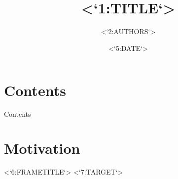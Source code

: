 \documentclass[17pt,dvipdfmx]{beamer}
\title{<`1:TITLE`>}
\author{<`2:AUTHORS`>}
\institute[<`3:INST`>]{<`4:FULLINST`>}
\date{<`5:DATE`>}
\begin{document}
\frame{\titlepage}

\section*{Contents}
\begin{frame}{Contents}
    \tableofcontents
\end{frame}

\section{Motivation}
\begin{frame}{<`6:FRAMETITLE`>}
    <`7:TARGET`>
\end{frame}
\end{document}
